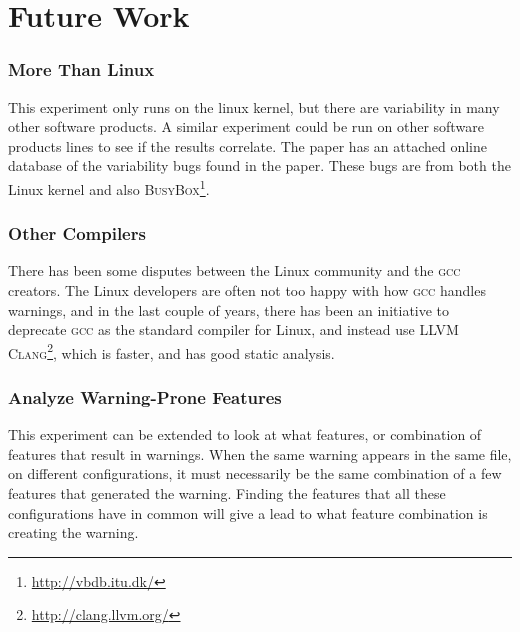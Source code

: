 \documentclass[a4paper,11pt]{report}
\newcommand{\f}{\footnote{\fn}}
\begin{document}
            \chapter{Future Work}

            \subsection*{More Than Linux}

            \def \fn {\url{http://vbdb.itu.dk/}}

This experiment only runs on the linux kernel, but there are variability in many
other software products. A similar experiment could be run on other software products lines to 
see if the results correlate. The paper \cite{42bugs} has an attached online 
database of the variability bugs found in the paper. These bugs are from both 
the Linux kernel and also \textsc{BusyBox}\f.

            \subsection*{Other Compilers}
            

            \def \fn {\url{http://clang.llvm.org/}}

There has been some disputes between the Linux community and the \textsc{gcc} 
creators\cite{linusgcc}. The Linux developers are  often not too happy with how \textsc{gcc} 
handles warnings, and in the last couple of years, there has been an initiative 
to deprecate \textsc{gcc} as the standard compiler for Linux, and instead use 
\textsc{LLVM Clang}\f, which is faster, and has good static analysis\cite{clang}.


            \subsection*{Analyze Warning-Prone Features}

This experiment can be extended to look at what features, or combination of 
features that result in warnings. When the same warning appears in the same 
file, on different configurations, it must necessarily be the same combination 
of a few features that generated the warning. Finding the features that all these
configurations have in common will give a lead to what feature combination is 
creating the warning.
\end{document}
